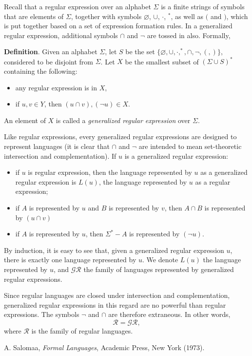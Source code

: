 \documentclass[12pt]{article}
\begin{document}
Recall that a regular expression over an alphabet $\Sigma$ is a finite strings of symbols that are elements of $\Sigma$, together with symbols $\varnothing$, $\cup$, $\cdot$, $^*$, as well as $($ and $)$, which is put together based on a set of expression formation rules.  In a generalized regular expression, additional symbols $\cap$ and $\neg$ are tossed in also.  Formally,

\textbf{Definition}.  Given an alphabet $\Sigma$, let $S$ be the set $\lbrace \varnothing, \cup, \cdot, ^*, \cap, \neg, (, ) \rbrace$, considered to be disjoint from $\Sigma$.  Let $X$ be the smallest subset of $(\Sigma\cup S)^*$ containing the following:
\begin{itemize}
\item any regular expression is in $X$,
\item if $u,v\in Y$, then $(u\cap v), (\neg u)\in X$.
\end{itemize}
An element of $X$ is called a \emph{generalized regular expression} over $\Sigma$.

Like regular expressions, every generalized regular expressions are designed to represent languages (it is clear that $\cap$ and $\neg$ are intended to mean set-theoretic intersection and complementation).  If $u$ is a generalized regular expression: 
\begin{itemize}
\item if $u$ is regular expression, then the language represented by $u$ as a generalized regular expression is $L(u)$, the language represented by $u$ as a regular expression;
\item if $A$ is represented by $u$ and $B$ is represented by $v$, then $A\cap B$ is represented by $(u\cap v)$
\item if $A$ is represented by $u$, then $\Sigma^* - A$ is represented by $(\neg u)$.
\end{itemize}
By induction, it is easy to see that, given a generalized regular expression $u$, there is exactly one language represented by $u$.  We denote $L(u)$ the language represented by $u$, and $\mathscr{GR}$ the family of languages represented by generalized regular expressions.

Since regular languages are closed under intersection and complementation, generalized regular expressions in this regard are no powerful than regular expressions.  The symbols $\neg$ and $\cap$ are therefore extraneous.  In other words, 
$$\mathscr{R}=\mathscr{GR},$$
where $\mathscr{R}$ is the family of regular languages.

\begin{thebibliography}{9}
 A. Salomaa, {\em Formal Languages}, Academic Press, New York (1973).
\end{thebibliography}
\end{document}

